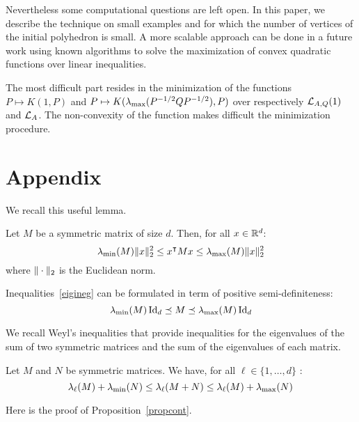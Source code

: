 \documentclass[10pt]{llncs}
\begin{document}
Nevertheless some computational questions are left open. In this paper, we describe the technique on small examples and for which the number of vertices of the initial polyhedron is small. A more scalable approach can be done in a future work using known algorithms to solve the maximization of convex quadratic functions over linear inequalities. 

The most  difficult part resides in the minimization of the functions $P\mapsto K(1,P)$ and $P\mapsto K(\lambda_{\operatorname{max}}(P^{-1/2} Q P^{-1/2}),P)$ over respectively $\mathcal{L}_{A,Q}(1)$ and $\mathcal{L}_{A}$. The non-convexity of the function makes difficult the minimization procedure.         



\newpage

\section*{Appendix}

We recall this useful lemma.

\begin{lemma}
\label{lemma1}
Let $M$ be a symmetric matrix of size $d$. 
Then, for all $x\in \mathbb R^d$:
\begin{equation}
\label{eigineg}
\lambda_{\operatorname{min}}(M)\| x\|_2^2\leq x^\intercal M x\leq \lambda_{\operatorname{max}}(M) \| x\|_2^2
\end{equation}
where $\| \cdot\|_2$ is the Euclidean norm. 
\end{lemma}
Inequalities~\eqref{eigineg} can be formulated in term of positive semi-definiteness:
\[
\lambda_{\operatorname{min}}(M)\operatorname{Id}_d\preceq M\preceq \lambda_{\operatorname{max}}(M)\operatorname{Id}_d
\]

We recall Weyl's inequalities that provide inequalities for the eigenvalues of the sum of two symmetric matrices and the sum of the eigenvalues of each matrix.  
\begin{lemma}
\label{lemmaWeyl}
Let $M$ and $N$ be symmetric matrices. We have, for all $\ell\in\{1,\ldots,d\}$ :
\[
\lambda_\ell(M)+\lambda_{\operatorname{min}}(N)\leq \lambda_\ell(M+N)\leq \lambda_\ell(M)+\lambda_{\operatorname{max}}(N)
\]
\end{lemma}

Here is the proof of Proposition~\ref{propcont}. 
\end{document}
